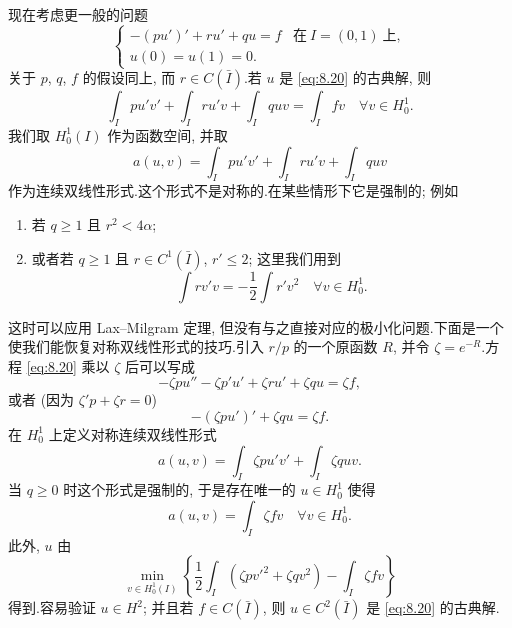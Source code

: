 \begin{starexample}
现在考虑更一般的问题
\begin{equation}
\begin{cases}
-(pu')'+ru'+qu=f & \text{在}\ I=(0,1)\ \text{上},\\
u(0)=u(1)=0.
\end{cases}
\label{eq:8.20}
\end{equation}
关于 $p$, $q$, $f$ 的假设同上, 而 $r\in C(\bar I)$.若 $u$ 是 \eqref{eq:8.20}
的古典解, 则
\begin{equation*}
\int_I pu'v'+\int_I ru'v+\int_I quv=\int_I fv\quad\forall v\in H_0^1.
\end{equation*}
我们取 $H_0^1(I)$ 作为函数空间, 并取
\begin{equation*}
a(u,v)=\int_I pu'v'+\int_I ru'v+\int_I quv
\end{equation*}
作为连续双线性形式.这个形式不是对称的.在某些情形下它是强制的; 例如
\begin{enumerate}[label=(\roman*), leftmargin=2.4em, itemsep=0.2em]
	\item 若 $q\ge1$ 且 $r^2<4\alpha$;
	\item 或者若 $q\ge1$ 且 $r\in C^1(\bar I)$, $r'\le2$; 这里我们用到
	      \begin{equation*}
	      \int rv'v=-\frac12\int r'v^2\quad\forall v\in H_0^1.
	      \end{equation*}
\end{enumerate}
这时可以应用 Lax--Milgram 定理, 但没有与之直接对应的极小化问题.下面是一个
使我们能恢复对称双线性形式的技巧.引入 $r/p$ 的一个原函数 $R$, 并令
$\zeta=e^{-R}$.方程 \eqref{eq:8.20} 乘以 $\zeta$ 后可以写成
\begin{equation*}
-\zeta pu''-\zeta p'u'+\zeta ru'+\zeta qu=\zeta f,
\end{equation*}
或者 (因为 $\zeta'p+\zeta r=0$)
\begin{equation*}
-(\zeta pu')'+\zeta qu=\zeta f.
\end{equation*}
在 $H_0^1$ 上定义对称连续双线性形式
\begin{equation*}
a(u,v)=\int_I\zeta pu'v'+\int_I\zeta quv.
\end{equation*}
当 $q\ge0$ 时这个形式是强制的, 于是存在唯一的 $u\in H_0^1$ 使得
\begin{equation*}
a(u,v)=\int_I\zeta fv\quad\forall v\in H_0^1.
\end{equation*}
此外, $u$ 由
\begin{equation*}
\min_{v\in H_0^1(I)}\left\{\frac12\int_I(\zeta pv'^2+\zeta qv^2)
-\int_I\zeta fv\right\}
\end{equation*}
得到.容易验证 $u\in H^2$; 并且若 $f\in C(\bar I)$, 则 $u\in C^2(\bar I)$ 是
\eqref{eq:8.20} 的古典解.
\end{starexample}

